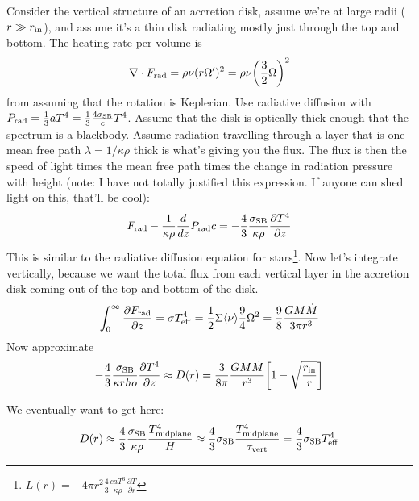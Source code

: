 \begin{enumerate}
      Consider the vertical structure of an accretion disk, assume we're at large radii ($r \gg r_{\rm in}$), and assume it's a thin disk radiating mostly just through the top and bottom. The heating rate per volume is
      \begin{equation}
      \nabla \cdot F_{\rm rad} = \rho \nu (r \Omega^\prime)^2 = \rho \nu \biggl(\frac{3}{2} \Omega \biggr)^2
      \end{equation}
      from assuming that the rotation is Keplerian. Use radiative diffusion with $P_{\rm rad} = \frac{1}{3} a T^4 = \frac{1}{3}\frac{4 \sigma_{\rm SB}}{c}T^4$. Assume that the disk is optically thick enough that the spectrum is a blackbody. Assume radiation travelling through a layer that is one mean free path $\lambda = 1/\kappa \rho$ thick is what's giving you the flux. The flux is then the speed of light times the mean free path times the change in radiation pressure with height (note: I have not totally justified this expression. If anyone can shed light on this, that'll be cool):
      \begin{equation}
      F_{\rm rad} - \frac{1}{\kappa \rho} \frac{d}{dz}P_{\rm rad} c = -\frac{4}{3}\frac{\sigma_{\rm SB}}{\kappa \rho}\frac{\partial T^4}{\partial z}
      \end{equation}
      This is similar to the radiative diffusion equation for stars\footnote{$L(r) = -4 \pi r^2 \frac{4}{3} \frac{c a T^3}{\kappa\rho}\frac{\partial T}{\partial r}$}. Now let's integrate vertically, because we want the total flux from each vertical layer in the accretion disk coming out of the top and bottom of the disk.
      \begin{equation}
      \int^\infty_0 \frac{\partial F_{\rm rad}}{\partial z} = \sigma T_{\rm eff}^4 = \frac{1}{2} \Sigma \langle \nu \rangle \frac{9}{4}\Omega^2 = \frac{9}{8} \frac{G M \dot{M}}{3 \pi r^3}
      \end{equation}
      Now approximate 
      \begin{equation}
      -\frac{4}{3} \frac{\sigma_{\rm SB}}{\kappa rho} \frac{\partial T^4}{\partial z} \approx D(r) = \frac{3}{8 \pi}\frac{GM\dot{M}}{r^3}\biggl[1 - \sqrt{\frac{r_{\rm in}}{r}} \biggr]
      \end{equation}
      
      We eventually want to get here:
      \begin{equation}
      D(r) \approx \frac{4}{3}\frac{\sigma_{\rm SB}}{\kappa \rho}\frac{T^4_{\rm midplane}}{H} \approx \frac{4}{3}\sigma_{\rm SB}\frac{T^4_{\rm midplane}}{\tau_{\rm vert}} = \frac{4}{3}\sigma_{\rm SB}T^4_{\rm eff}
      \end{equation}
      
      
\end{enumerate}

